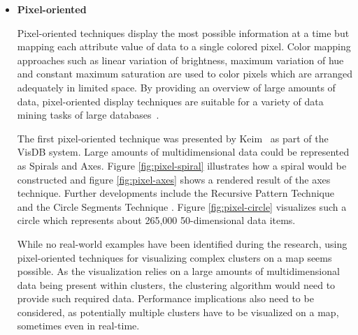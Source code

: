 \begin{itemize}
\item \textbf{Pixel-oriented}

Pixel-oriented techniques display the most possible information at a time but mapping each attribute value of data to a single colored pixel. Color mapping approaches such as linear variation of brightness, maximum variation of hue and constant maximum saturation are used to color pixels which are arranged adequately in limited space. By providing an overview of large amounts of data, pixel-oriented display techniques are suitable for a variety of data mining tasks of large databases~\cite{zhang07thesis}.

The first pixel-oriented technique was presented by Keim~\cite{keim94pixel} as part of the VisDB system. Large amounts of multidimensional data could be represented as Spirals and Axes. Figure \ref{fig:pixel-spiral} illustrates how a spiral would be constructed and figure \ref{fig:pixel-axes} shows a rendered result of the axes technique. Further developments include the Recursive Pattern Technique \cite{keim95recpat} and the Circle Segments Technique \cite{Ankerst96circlesegments}. Figure \ref{fig:pixel-circle} visualizes such a circle which represents about 265,000 50-dimensional data items.

While no real-world examples have been identified during the research, using pixel-oriented techniques for visualizing complex clusters on a map seems possible. As the visualization relies on a large amounts of multidimensional data being present within clusters, the clustering algorithm would need to provide such required data. Performance implications also need to be considered, as potentially multiple clusters have to be visualized on a map, sometimes even in real-time.


\end{itemize}
